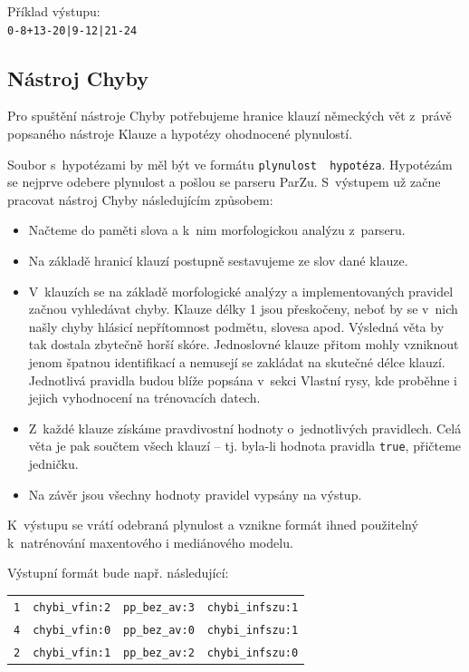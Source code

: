 \documentclass[12pt,a4paper]{report}
\begin{document}
Příklad výstupu:\\
\texttt{0-8+13-20|9-12|21-24}


\subsection{Nástroj Chyby}

Pro spuštění nástroje Chyby potřebujeme hranice klauzí německých vět z~právě popsaného nástroje Klauze a hypotézy ohodnocené plynulostí.

Soubor s~hypotézami by měl být ve formátu \texttt{plynulost \textbar ~hypotéza}. Hypotézám se nejprve odebere plynulost a pošlou se parseru ParZu. S~výstupem už začne pracovat nástroj Chyby následujícím způsobem:

\begin{itemize}
\item{Načteme do paměti slova a k~nim morfologickou analýzu z~parseru.}
\item{Na základě hranicí klauzí postupně sestavujeme ze slov dané klauze.}
\item{V~klauzích se na základě morfologické analýzy a implementovaných pravidel začnou vyhledávat chyby. Klauze délky 1 jsou přeskočeny, neboť by se v~nich našly chyby hlásicí nepřítomnost podmětu, slovesa apod. Výsledná věta by tak dostala zbytečně horší skóre. Jednoslovné klauze přitom mohly vzniknout jenom špatnou identifikací a nemusejí se zakládat na skutečné délce klauzí. Jednotlivá pravidla budou blíže popsána v~sekci Vlastní rysy, kde proběhne i jejich vyhodnocení na trénovacích datech.}
\item{Z~každé klauze získáme pravdivostní hodnoty o~jednotlivých pravidlech. Celá věta je pak součtem všech klauzí -- tj. byla-li hodnota pravidla \texttt{true}, přičteme jedničku.}
\item{Na závěr jsou všechny hodnoty pravidel vypsány na výstup.}
\end{itemize}

K~výstupu se vrátí odebraná plynulost a vznikne formát ihned použitelný k~natrénování maxentového i mediánového modelu.

Výstupní formát bude např. následující:

\begin{center}
\begin{tabular}{llll}
\hline
\texttt{1} & \texttt{chybi\_vfin:2} & \texttt{pp\_bez\_av:3} & \texttt{chybi\_infszu:1} \\
\texttt{4} & \texttt{chybi\_vfin:0} & \texttt{pp\_bez\_av:0} & \texttt{chybi\_infszu:1} \\
\texttt{2} & \texttt{chybi\_vfin:1} & \texttt{pp\_bez\_av:2} & \texttt{chybi\_infszu:0} \\
\hline
\end{tabular}
\end{center}
\end{document}
